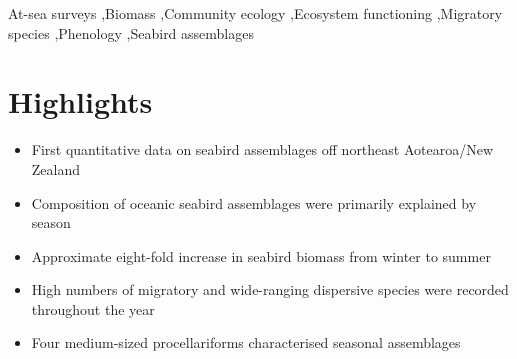 \documentclass[preprint, 3p, authoryear]{elsarticle} %
\begin{document}
\begin{frontmatter}
\begin{abstract}
   Migratory species may influence structural components of species assemblages, such as biomass and diversity patterns. A total of 10 ship-based, strip-transect seabird surveys were undertaken in all seasons (2019--2024) off the northeast coast of Northland, Aotearoa/New Zealand. Almost all seabird species recorded were migratory or wide-ranging dispersive (23 of 25). Multivariate model-based ordinations revealed that season primarily explained species assemblages, while including environmental variables such as sea surface temperature and chlorophyll-\emph{a} (useful proxies for studying seabird distribution) offered little extra explanatory power at the assemblage level. There was no clear spatial pattern in the assemblages, suggesting that the study area was used uniformly by the species present at the time. The total seabird biomass present was strongly influenced by the seasonal occurrence of four medium-sized, migratory procellariiforms: t\={a}iko (black petrel), rako (Buller’s shearwater), \={o}i (grey-faced petrel) and toanui (flesh-footed shearwater). The biomass estimates showed an eight-fold increase from winter (243 kg/km$^2$) to summer (1885 kg/km$^2$). Northland will likely be the first region in Aotearoa/New Zealand to experience the consequences of oceanic warming. The study establishes a baseline against which to measure potential future changes in seabird occurrences. Based on descriptive and modelling approaches, the study demonstrated the role of species' phenologies in shaping assemblages of seabird species and their impact on total estimated biomass, which may affect ecosystem functioning and energy fluxes.
  \end{abstract}
  
  \begin{keyword}
    At-sea surveys \sep Biomass \sep Community ecology \sep Ecosystem functioning \sep Migratory species \sep Phenology \sep Seabird assemblages
  \end{keyword}
  
 \end{frontmatter}

\hypertarget{highlights}{%
\section*{Highlights}\label{highlights}}

\begin{itemize}
\item
  First quantitative data on seabird assemblages off northeast Aotearoa/New Zealand
\item
  Composition of oceanic seabird assemblages were primarily explained by season
\item
  Approximate eight-fold increase in seabird biomass from winter to summer
\item  
  High numbers of migratory and wide-ranging dispersive species were recorded throughout the year
\item
  Four medium-sized procellariforms characterised seasonal assemblages
\end{itemize}
\end{document}
